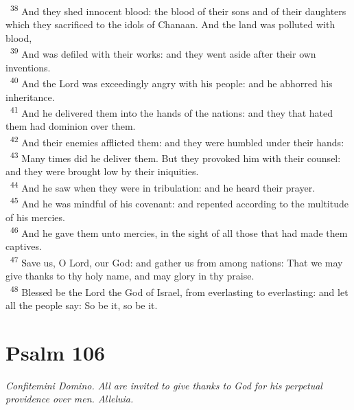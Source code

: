 \documentclass[a5paper,12pt]{article}
\begin{document}
\begin{multicols*}{2}
~\textsuperscript{38} And they shed innocent blood: the blood of their sons and of their daughters which they sacrificed to the idols of Chanaan. And the land was polluted with blood,\\
~\textsuperscript{39} And was defiled with their works: and they went aside after their own inventions.\\
~\textsuperscript{40} And the Lord was exceedingly angry with his people: and he abhorred his inheritance.\\
~\textsuperscript{41} And he delivered them into the hands of the nations: and they that hated them had dominion over them.\\
~\textsuperscript{42} And their enemies afflicted them: and they were humbled under their hands:\\
~\textsuperscript{43} Many times did he deliver them. But they provoked him with their counsel: and they were brought low by their iniquities.\\
~\textsuperscript{44} And he saw when they were in tribulation: and he heard their prayer.\\
~\textsuperscript{45} And he was mindful of his covenant: and repented according to the multitude of his mercies.\\
~\textsuperscript{46} And he gave them unto mercies, in the sight of all those that had made them captives.\\
~\textsuperscript{47} Save us, O Lord, our God: and gather us from among nations: That we may give thanks to thy holy name, and may glory in thy praise.\\
~\textsuperscript{48} Blessed be the Lord the God of Israel, from everlasting to everlasting: and let all the people say: So be it, so be it.\\

\section{Psalm 106}
\label{sec:org3e2fae5}
\emph{Confitemini Domino. All are invited to give thanks to God for his perpetual providence over men. Alleluia.}\\


\end{multicols*}
\end{document}
